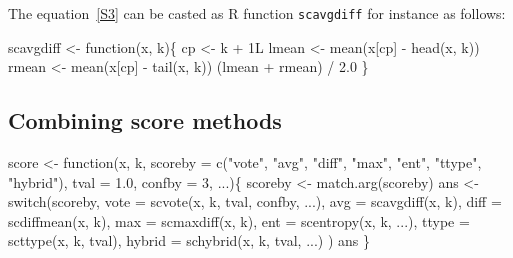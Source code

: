\documentclass[a4paper]{article}
\begin{document}
The equation~\eqref{S3} can be casted as R function \verb?scavgdiff?
for instance as follows:

\nwenddocs{}\endmoddef
scavgdiff <- function(x, k)\{
    cp <- k + 1L
    lmean <- mean(x[cp] - head(x, k))
    rmean <- mean(x[cp] - tail(x, k))
    (lmean + rmean) / 2.0
\}
\eatline
{}\nwendcode{}%




\subsection{Combining score methods}

\nwenddocs{}\endmoddef
score <- function(x, k,
                  scoreby = c("vote", "avg", "diff", "max", "ent",
                              "ttype", "hybrid"),
                  tval = 1.0, confby = 3, ...)\{
    scoreby <- match.arg(scoreby)
    ans <- switch(scoreby,
                  vote = scvote(x, k, tval, confby, ...),
                  avg = scavgdiff(x, k),
                  diff = scdiffmean(x, k),
                  max = scmaxdiff(x, k),
                  ent = scentropy(x, k, ...),
                  ttype = scttype(x, k, tval),
                  hybrid = schybrid(x, k, tval, ...)
                  )
    ans
\}
\eatline
{}\nwendcode{}%
\end{document}
